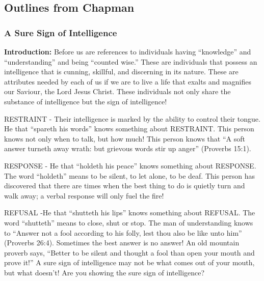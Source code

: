 \subsection{Outlines from Chapman}


\subsubsection{A Sure Sign of Intelligence}


\noindent  \textbf{Introduction: } Before us are references to individuals having “knowledge” and “understanding” and being “counted wise.” These are individuals that possess an intelligence that is cunning, skillful, and discerning in its nature. These are attributes needed by each of us if we are to live a life that exalts and magnifies our Saviour, the Lord Jesus Christ. These individuals not only share the substance of intelligence but the sign of intelligence!

\begin{compactenum}[I.]
    \item RESTRAINT -  Their intelligence is marked by the ability to control their tongue. He that “spareth his words” knows something about RESTRAINT. This person knows not only when to talk, but how much! This person knows that “A soft answer turneth away wrath: but grievous words stir up anger” (Proverbs 15:1).
    \item RESPONSE - He that “holdeth his peace” knows something about RESPONSE. The word “holdeth” means to be silent, to let alone, to be deaf. This person has discovered that there are times when the best thing to do is quietly turn and walk away; a verbal response will only fuel the fire!
    \item REFUSAL -He that “shutteth his lips” knows something about REFUSAL. The word “shutteth” means to close, shut or stop. The man of understanding knows to “Answer not a fool according to his folly, lest thou also be like unto him” (Proverbs 26:4). Sometimes the best answer is no answer! An old mountain proverb says, “Better to be silent and thought a fool than open your mouth and prove it!” A sure sign of intelligence may not be what comes out of your mouth, but what doesn’t! Are you showing the sure sign of intelligence?
\end{compactenum}





